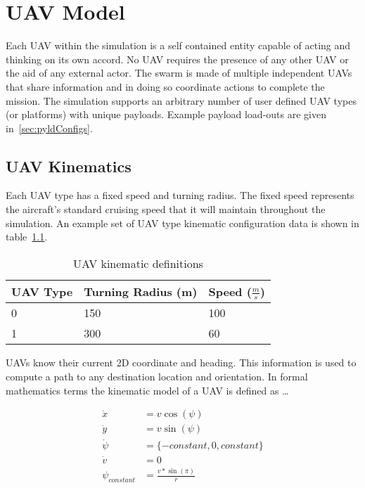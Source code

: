 \chapter{UAV Model}
Each UAV within the simulation is a self contained entity capable of acting and thinking on its own accord.  No UAV requires the presence of any other UAV or the aid of any external actor.  The swarm is made of multiple independent UAVs that share information and in doing so coordinate actions to complete the mission.  The simulation supports an arbitrary number of user defined UAV types (or platforms) with unique payloads.  Example payload load-outs are given in~\ref{sec:pyldConfigs}.


\section{UAV Kinematics}
Each UAV type has a fixed speed and turning radius.  The fixed speed represents the aircraft's standard cruising speed that it will maintain throughout the simulation.  An example set of UAV type kinematic configuration data is shown in table~\ref{tab:uavKinematic}.

\begin{table}[H]
	\caption{UAV kinematic definitions}
	\centering
	\label{tab:uavKinematic}
	\begin{tabular}{|p{1cm}|p{2cm}|p{1cm}|}
		\hline
		UAV Type & Turning Radius (m) & Speed ($\frac{m}{s}$)\\ \hline
		0 & 150 & 100 \\
		1 & 300 & 60 \\
		\hline
	\end{tabular}
\end{table}

UAVs know their current 2D coordinate and heading.  This information is used to compute a path to any destination location and orientation.  In formal mathematics terms the kinematic model of a UAV is defined as \dots

\begin{align}
\dot{x} &= v \cos(\psi) \label{eq:uavChngX}\\
\dot{y} &= v \sin(\psi) \label{eq:uavChngY}\\
\dot{\psi} &= \{-constant, 0, constant\} \label{eq:uavTurnRate}\\
\dot{v} &= 0 \label{eq:uavAccel}\\
\psi_{constant} &= \frac{v*\sin(\pi)}{r} \label{eq:uavTurnRateDeriv}
\end{align}

